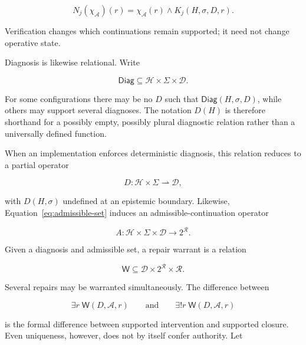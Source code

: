 \documentclass[11pt]{article}
\begin{document}
\begin{equation}
N_j(\chi_{\mathcal A})(r)
=
\chi_{\mathcal A}(r)\land K_j(H,\sigma,D,r).
\label{eq:narrowing}
\end{equation}

Verification changes which continuations remain supported; it need not change operative state.

Diagnosis is likewise relational. Write

\begin{equation}
\mathsf{Diag}\subseteq\mathcal H\times\Sigma\times\mathcal D.
\end{equation}

For some configurations there may be no $D$ such that $\mathsf{Diag}(H,\sigma,D)$, while others may support several diagnoses. The notation $D(H)$ is therefore shorthand for a possibly empty, possibly plural diagnostic relation rather than a universally defined function.

When an implementation enforces deterministic diagnosis, this relation reduces to a partial operator

\begin{equation}
D:\mathcal H\times\Sigma\rightharpoonup\mathcal D,
\end{equation}

with $D(H,\sigma)$ undefined at an epistemic boundary. Likewise, Equation~\eqref{eq:admissible-set} induces an admissible-continuation operator

\begin{equation}
A:\mathcal H\times\Sigma\times\mathcal D
\longrightarrow 2^{\mathcal R}.
\end{equation}

Given a diagnosis and admissible set, a repair warrant is a relation

\begin{equation}
\mathsf W\subseteq
\mathcal D\times 2^{\mathcal R}\times\mathcal R.
\label{eq:warrant-relation}
\end{equation}

Several repairs may be warranted simultaneously. The difference between

\begin{equation}
\exists r\;\mathsf W(D,\mathcal A,r)
\qquad\text{and}\qquad
\exists!r\;\mathsf W(D,\mathcal A,r)
\end{equation}

is the formal difference between supported intervention and supported closure. Even uniqueness, however, does not by itself confer authority. Let
\end{document}
